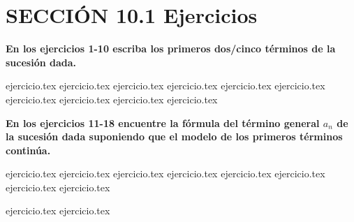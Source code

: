 
\section*{SECCIÓN 10.1 \quad Ejercicios}

\noindent\textbf{En los ejercicios 1-10 escriba los primeros dos/cinco términos de la sucesión dada.}
\begin{enumerate}
    {ejercicio.tex}
{ejercicio.tex}
{ejercicio.tex}
{ejercicio.tex}
{ejercicio.tex}
{ejercicio.tex}
{ejercicio.tex}
{ejercicio.tex}
{ejercicio.tex}
{ejercicio.tex}
\end{enumerate}

\vspace{0.3cm}
\noindent\textbf{En los ejercicios 11-18 encuentre la fórmula del término general $a_n$ de la sucesión dada suponiendo que el modelo de los primeros términos continúa.}
\begin{enumerate}
    \setcounter{enumi}{10}
    {ejercicio.tex}
{ejercicio.tex}
{ejercicio.tex}
{ejercicio.tex}
{ejercicio.tex}
{ejercicio.tex}
{ejercicio.tex}
{ejercicio.tex}
\end{enumerate}

\vspace{0.3cm}
\begin{enumerate}
    \setcounter{enumi}{18}
    {ejercicio.tex}
{ejercicio.tex}
\end{enumerate}

